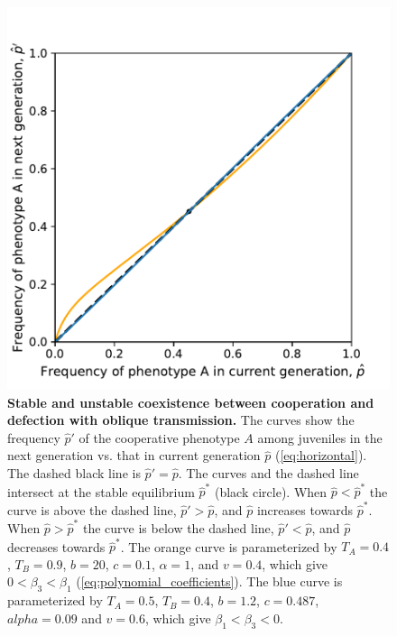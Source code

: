 \documentclass[12pt]{extarticle}
\begin{document}
{%
\begin{figure}[h]
  \centering
  \includegraphics[scale=0.55]{coexistence_with_oblique.pdf}
  \caption{\textbf{Stable and unstable coexistence between cooperation and defection with oblique transmission.}
  The curves show the frequency $\hat{p}'$ of the cooperative phenotype $A$ among juveniles in the next generation vs. that in current generation $\hat{p}$ (\autoref{eq:horizontal}).
  The dashed black line is $\hat{p}'=\hat{p}$.
  The curves and the dashed line intersect at the stable equilibrium $\hat{p}^*$ (black circle).
  When $\hat{p} < \hat{p}^*$ the curve is above the dashed line, $\hat{p}' > \hat{p}$, and $\hat{p}$ increases towards $\hat{p}^*$.
  When $\hat{p} > \hat{p}^*$ the curve is below the dashed line, $\hat{p}' < \hat{p}$, and $\hat{p}$ decreases towards $\hat{p}^*$.
  The orange curve is parameterized by $T_A = 0.4$, $T_B = 0.9$, $b = 20$, $c=0.1$, $\alpha = 1$, and $v=0.4$, which give $0<\beta_3<\beta_1$ (\autoref{eq:polynomial_coefficients}).
  The blue curve is parameterized by $T_A = 0.5$, $T_B = 0.4$, $b=1.2$, $c=0.487$, $alpha = 0.09$ and $v=0.6$, which give $\beta_1<\beta_3<0$.
  }
  \label{fig:coexistence_with_oblique}
  \end{figure}



}
\end{document}

